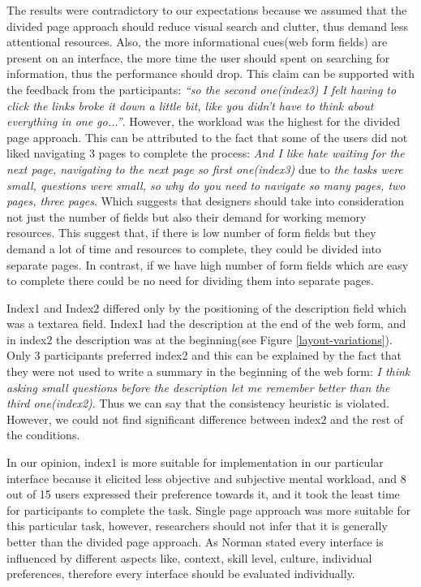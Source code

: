 \documentclass[../main/Replicate.tex]{subfiles}
\begin{document}
	The results were contradictory to our expectations because we assumed that the divided page approach should reduce visual search and clutter, thus demand less attentional resources. 
	Also, the more informational cues(web form fields) are present on an interface, the more time the user should spent on searching for information, thus the performance should drop. 
	This claim can be supported with the feedback from the participants: \textit{``so the second one(index3) I felt having to click the links broke it down a little bit, like you didn't have to think about everything in one go...''}. 
	However, the workload was the highest for the divided page approach. This can be attributed to the fact that some of the users did not liked navigating 3 pages to complete the process: \textit{And I like hate waiting for the next page, navigating to the next page so first one(index3)} due to \textit{the tasks were small, questions were small, so why do you need to navigate so many pages, two pages, three pages}. 
	Which suggests that designers should take into consideration not just the number of fields but also their demand for working memory resources. 
	This suggest that, if there is low number of form fields but they demand a lot of time and resources to complete, they could be divided into separate pages. 
	In contrast, if we have high number of form fields which are easy to complete there could be no need for dividing them into separate pages.

	Index1 and Index2 differed only by the positioning of the description field which was a textarea field. 
	Index1 had the description at the end of the web form, and in index2 the description was at the beginning(see Figure \ref{layout-variations}). 
	Only 3 participants preferred index2 and this can be explained by the fact that they were not used to write a summary in the beginning of the web form: \textit{I think asking small questions before the description let me remember better than the third one(index2)}. 
	Thus we can say that the consistency heuristic is violated. 
	However, we could not find significant difference between index2 and the rest of the conditions.	
	
	In our opinion, index1 is more suitable for implementation in our particular interface because it elicited less objective and subjective mental workload, and 8 out of 15 users expressed their preference towards it, and it took the least time for participants to complete the task. 
	Single page approach was more suitable for this particular task, however, researchers should not infer that it is generally better than the divided page approach. 
	As Norman stated \cite{norman1986user} every interface is influenced by different aspects like, context, skill level, culture, individual preferences, therefore every interface should be evaluated individually. 
\end{document}

